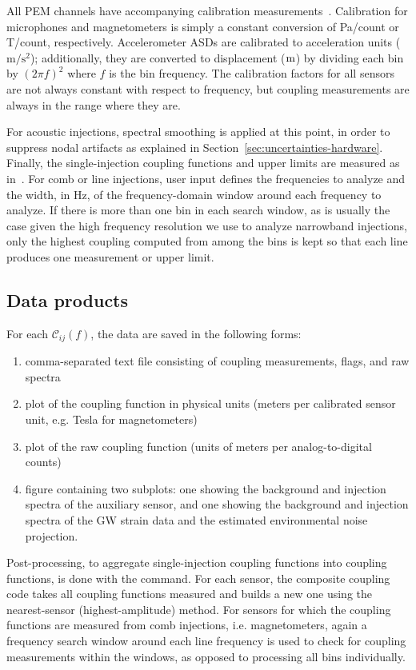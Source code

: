 All \ac{PEM} channels have accompanying calibration measurements~\citep{PEM_website}. Calibration for microphones and magnetometers is simply a constant conversion of Pa/count or T/count, respectively.
Accelerometer \acp{ASD} are calibrated to acceleration units ($\mathrm{m/s^2}$); additionally, they are converted to displacement ($\meter$) by dividing each bin by $(2\pi f)^2$ where $f$ is the bin frequency.
The calibration factors for all sensors are not always constant with respect to frequency, but coupling measurements are always in the range where they are.

For acoustic injections, spectral smoothing is applied at this point, in order to suppress nodal artifacts as explained in Section~\ref{sec:uncertainties-hardware}.
Finally, the single-injection coupling functions and upper limits are measured as in~.
For comb or line injections, user input defines the frequencies to analyze and the width, in Hz, of the frequency-domain window around each frequency to analyze.
If there is more than one bin in each search window, as is usually the case given the high frequency resolution we use to analyze narrowband injections, only the highest coupling computed from among the bins is kept so that each line produces one measurement or upper limit.


\subsection{Data products}

For each $\mathcal{C}_{ij}(f)$, the data are saved in the following forms:
\begin{enumerate}
	\item comma-separated text file consisting of coupling measurements, flags, and raw spectra
	\item plot of the coupling function in physical units (meters per calibrated sensor unit, e.g. Tesla for magnetometers)
	\item plot of the  raw coupling function (units of meters per analog-to-digital counts)
	\item figure containing two subplots: one showing the background and injection spectra of the auxiliary sensor, and one showing the background and injection spectra of the \ac{GW} strain data and the estimated environmental noise projection.
\end{enumerate}

Post-processing, to aggregate single-injection coupling functions into coupling functions, is done with the  command.
For each sensor, the composite coupling code takes all coupling functions measured and builds a new one using the nearest-sensor (highest-amplitude) method.
For sensors for which the coupling functions are measured from comb injections, i.e. magnetometers, again a frequency search window around each line frequency is used to check for coupling measurements within the windows, as opposed to processing all bins individually.

